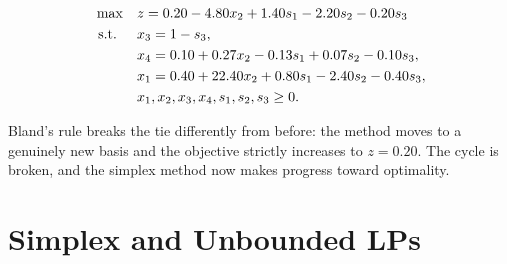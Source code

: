 \[
\begin{aligned}
\max \quad & z = 0.20 - 4.80x_2 + 1.40s_1 - 2.20s_2 - 0.20s_3 \\
\mbox{ s.t. } \quad 
& x_3 = 1 - s_3, \\
& x_4 = 0.10 + 0.27x_2 - 0.13s_1 + 0.07s_2 - 0.10s_3, \\
& x_1 = 0.40 + 22.40x_2 + 0.80s_1 - 2.40s_2 - 0.40s_3, \\
& x_1, x_2, x_3, x_4, s_1, s_2, s_3 \geq 0.
\end{aligned}
\]

\noindent Bland's rule breaks the tie differently from before: the method moves to a genuinely new basis and the objective strictly increases to $z=0.20$. The cycle is broken, and the simplex method now makes progress toward optimality.

\section{Simplex and Unbounded LPs}

